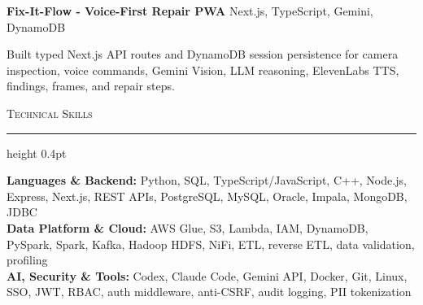 \documentclass[letterpaper,11pt]{article}
\newcommand{\resumesection}[1]{%
  \par\vspace{2pt}%
  {\large\scshape #1}\par\vspace{2pt}%
  \hrule height 0.4pt\vspace{2pt}%
}
\newcommand{\projectHeading}[2]{
  \textbf{#1} \hfill #2
}
\begin{document}
\projectHeading{Fix-It-Flow - Voice-First Repair PWA}{Next.js, TypeScript, Gemini, DynamoDB}
\begin{tightitemize}
  \item Built typed Next.js API routes and DynamoDB session persistence for camera inspection, voice commands, Gemini Vision, LLM reasoning, ElevenLabs TTS, findings, frames, and repair steps.
\end{tightitemize}

\resumesection{Technical Skills}
\textbf{Languages \& Backend:} Python, SQL, TypeScript/JavaScript, C++, Node.js, Express, Next.js, REST APIs, PostgreSQL, MySQL, Oracle, Impala, MongoDB, JDBC\\
\textbf{Data Platform \& Cloud:} AWS Glue, S3, Lambda, IAM, DynamoDB, PySpark, Spark, Kafka, Hadoop HDFS, NiFi, ETL, reverse ETL, data validation, profiling\\
\textbf{AI, Security \& Tools:} Codex, Claude Code, Gemini API, Docker, Git, Linux, SSO, JWT, RBAC, auth middleware, anti-CSRF, audit logging, PII tokenization
\end{document}
